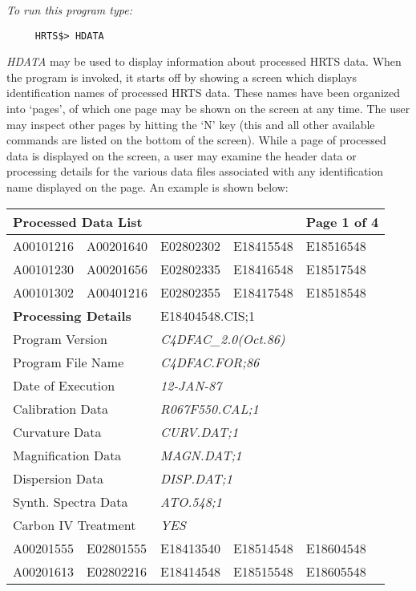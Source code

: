{\em To run this program type:}
\begin{verbatim}
     HRTS$> HDATA
\end{verbatim}
   {\em HDATA} may be used to display information about processed HRTS data.
    When the program is invoked, it starts off by showing a screen which
    displays identification names of processed HRTS data.  These names have
    been organized into `pages', of which one page may be shown on the
    screen at any time.  The user may inspect other pages by hitting the
    `N' key (this and all other available commands are listed on the bottom
    of the screen).
    While a page of processed data is displayed on the screen, a user
    may examine the header data or processing details for the various data
    files associated with any identification name displayed on the page.
    An example is shown below:
\begin{center}
\begin{tabular}{|l|l|l|l|l|}
\hline
\multicolumn{4}{|l}{\bf Processed Data List} & \multicolumn{1}{l|}{\bf Page 1 of
4}
\\ \hline
       A00101216 &  A00201640 &  E02802302 &  E18415548 &  E18516548  \\
       A00101230 &  A00201656 &  E02802335 &  E18416548 &  E18517548  \\
       A00101302 &  A00401216 &  E02802355 &  E18417548 &  E18518548  \\
\hline \hline
\multicolumn{2}{||l}{\bf Processing Details} &
\multicolumn{3}{l||}{E18404548.CIS;1}
\\
\hline \hline
\multicolumn{2}{||l}{Program Version} & \multicolumn{3}{l||}{\em
C4DFAC\_2.0(Oct.86)} \\
\multicolumn{2}{||l}{Program File Name} & \multicolumn{3}{l||}{\em
C4DFAC.FOR;86} \\
\multicolumn{2}{||l}{Date of Execution} & \multicolumn{3}{l||}{\em 12-JAN-87}
 \\
\multicolumn{2}{||l}{ Calibration Data} & \multicolumn{3}{l||}{\em
R067F550.CAL;1} \\
\multicolumn{2}{||l}{Curvature Data} & \multicolumn{3}{l||}{\em CURV.DAT;1} \\
\multicolumn{2}{||l}{Magnification Data} & \multicolumn{3}{l||}{\em
MAGN.DAT;1}\\
\multicolumn{2}{||l}{Dispersion Data} & \multicolumn{3}{l||}{\em DISP.DAT;1} \\
\multicolumn{2}{||l}{Synth. Spectra Data} & \multicolumn{3}{l||}{\em ATO.548;1}
\\
\multicolumn{2}{||l}{Carbon IV Treatment} & \multicolumn{3}{l||}{\em YES}  \\
\hline \hline
       A00201555 &  E02801555 &  E18413540 &  E18514548 &  E18604548 \\
       A00201613 &  E02802216 &  E18414548 &  E18515548 &  E18605548 \\
\hline
\end{tabular}
\end{center}
